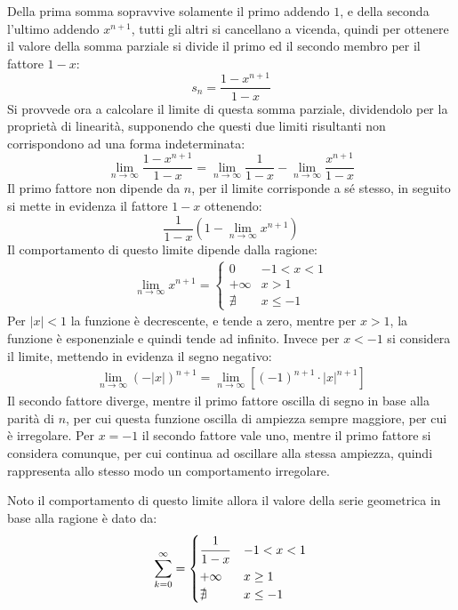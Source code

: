\documentclass{article}
\numberwithin{equation}{subsection}
\begin{document}
Della prima somma sopravvive solamente il primo addendo $1$, e della seconda l'ultimo addendo $x^{n+1}$, tutti gli altri si cancellano a vicenda, quindi per ottenere il valore della somma parziale si divide il primo ed il secondo membro per il fattore $1-x$:
\begin{equation}
    s_n=\displaystyle\frac{1-x^{n+1}}{1-x}
\end{equation}
Si provvede ora a calcolare il limite di questa somma parziale, dividendolo per la proprietà di linearità, supponendo che questi due limiti risultanti non corrispondono ad una forma indeterminata:
\begin{equation*}
    \lim_{n\to\infty}\displaystyle\frac{1-x^{n+1}}{1-x}=\lim_{n\to\infty}\frac{1}{1-x}-\lim_{n\to\infty}\frac{x^{n+1}}{1-x}
\end{equation*}
Il primo fattore non dipende da $n$, per il limite corrisponde a sé stesso, in seguito si mette in evidenza il fattore $1-x$ ottenendo:
\begin{equation*}
    \displaystyle\frac{1}{1-x}\left(1-\lim_{n\to\infty}x^{n+1}\right)
\end{equation*}
Il comportamento di questo limite dipende dalla ragione:
\begin{gather*}
    \lim_{n\to\infty}x^{n+1}=\begin{cases}
        0 &-1<x<1\\
        +\infty  & x>1\\
        \nexists & x\leq-1
    \end{cases}
\end{gather*}
Per $|x|<1$ la funzione è decrescente, e tende a zero, mentre per $x>1$, la funzione è esponenziale e quindi tende ad infinito. Invece per $x<-1$ si considera il limite, mettendo in evidenza il segno negativo:
\begin{gather*}
    \lim_{n\to\infty}(-|x|)^{n+1}=
    \lim_{n\to\infty}\left[(-1)^{n+1}\cdot |x|^{n+1}\right]
\end{gather*}
Il secondo fattore diverge, mentre il primo fattore oscilla di segno in base alla parità di $n$, per cui questa funzione oscilla di ampiezza sempre maggiore, per cui è irregolare. 
Per $x=-1$ il secondo fattore vale uno, mentre il primo fattore si considera comunque, per cui continua ad oscillare alla stessa ampiezza, quindi rappresenta allo stesso modo un comportamento irregolare. 

Noto il comportamento di questo limite allora il valore della serie geometrica in base alla ragione è dato da:
\begin{equation*}
    \displaystyle\sum_{k=0}^\infty=\begin{cases}
        \displaystyle\frac{\strut 1}{\strut 1-x} &-1<x<1\\
        +\infty & x\geq1\\
        \nexists & x\leq-1
    \end{cases}
\end{equation*}
\end{document}

